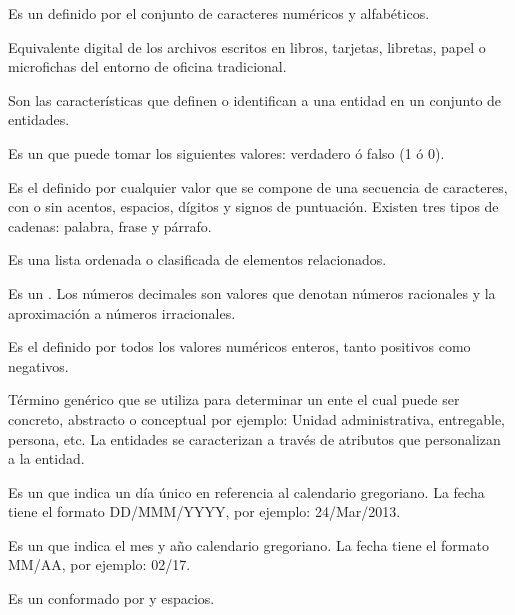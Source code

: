 \begin{description}

 Es un  definido por el conjunto de caracteres numéricos y alfabéticos.

 Equivalente digital de los archivos escritos en libros, tarjetas, libretas, papel o microfichas del entorno de oficina tradicional.

 Son las características que definen o identifican a una entidad en un conjunto de entidades.

 Es un  que puede tomar los siguientes valores: verdadero ó falso (1 ó 0).

 Es el  definido por cualquier valor que se compone de una secuencia de caracteres, con o sin acentos, espacios, dígitos y signos de puntuación. Existen tres tipos de cadenas: palabra, frase y párrafo.

 Es una lista ordenada o clasificada de elementos relacionados.

 Es un  . Los números decimales son valores que denotan números racionales y la aproximación a números irracionales.

 Es el   definido por todos los valores numéricos enteros, tanto positivos como negativos.

 Término genérico que se utiliza para determinar un ente el cual puede ser concreto, abstracto o conceptual por ejemplo: Unidad administrativa, entregable, persona, etc. La entidades se caracterizan a través de atributos que personalizan a la entidad.		

 Es un  que indica un día único en referencia al calendario gregoriano. La fecha tiene el formato DD/MMM/YYYY, por ejemplo: 24/Mar/2013.

 Es un  que indica el mes y año calendario gregoriano. La fecha tiene el formato MM/AA, por ejemplo: 02/17.

 Es un   conformado por  y espacios.


\end{description}
